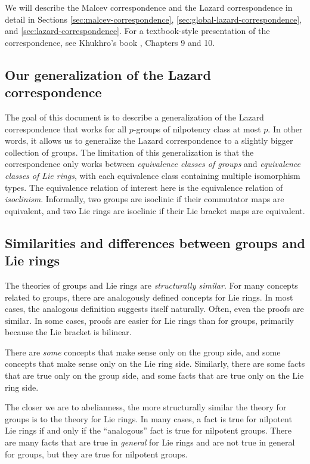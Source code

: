 We will describe the Malcev correspondence and the Lazard
correspondence in detail in Sections \ref{sec:malcev-correspondence},
\ref{sec:global-lazard-correspondence}, and
\ref{sec:lazard-correspondence}. For a textbook-style presentation of
the correspondence, see Khukhro's book \cite{Khukhro}, Chapters 9 and
10.

\subsection{Our generalization of the Lazard correspondence}

The goal of this document is to describe a generalization of the
Lazard correspondence that works for all $p$-groups of nilpotency
class at most $p$. In other words, it allows us to generalize the
Lazard correspondence to a slightly bigger collection of groups. The
limitation of this generalization is that the correspondence only
works between {\em equivalence classes of groups} and {\em equivalence
  classes of Lie rings}, with each equivalence class containing
multiple isomorphism types. The equivalence relation of interest here
is the equivalence relation of {\em isoclinism}. Informally, two
groups are isoclinic if their commutator maps are equivalent, and two
Lie rings are isoclinic if their Lie bracket maps are equivalent.

\subsection{Similarities and differences between groups and Lie rings}

The theories of groups and Lie rings are {\em structurally
  similar}. For many concepts related to groups, there are analogously
defined concepts for Lie rings. In most cases, the analogous
definition suggests itself naturally. Often, even the proofs are
similar. In some cases, proofs are easier for Lie rings than for
groups, primarily because the Lie bracket is bilinear.

There are {\em some} concepts that make sense only on the group side,
and some concepts that make sense only on the Lie ring
side. Similarly, there are some facts that are true only on the group
side, and some facts that are true only on the Lie ring side.

The closer we are to abelianness, the more structurally similar the
theory for groups is to the theory for Lie rings. In many cases, a
fact is true for nilpotent Lie rings if and only if the ``analogous''
fact is true for nilpotent groups. There are many facts that are true
in {\em general} for Lie rings and are not true in general for groups,
but they are true for nilpotent groups.

